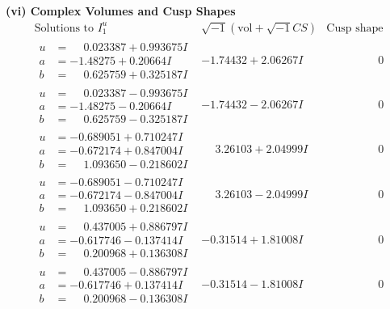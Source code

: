 \documentclass[1p]{elsarticle_modified}
\theoremstyle{definition}
\newcommand{\I}{\sqrt{-1}}
\begin{document}
\newpage\flushleft \textbf{(vi) Complex Volumes and Cusp Shapes}
$$\begin{array}{c|c|c}  
\text{Solutions to }I^u_{1}& \I (\text{vol} + \sqrt{-1}CS) & \text{Cusp shape}\\
 \hline 
\begin{aligned}
u &= \phantom{-}0.023387 + 0.993675 I \\
a &= -1.48275 + 0.20664 I \\
b &= \phantom{-}0.625759 + 0.325187 I\end{aligned}
 & -1.74432 + 2.06267 I & \phantom{-0.000000 } 0 \\ \hline\begin{aligned}
u &= \phantom{-}0.023387 - 0.993675 I \\
a &= -1.48275 - 0.20664 I \\
b &= \phantom{-}0.625759 - 0.325187 I\end{aligned}
 & -1.74432 - 2.06267 I & \phantom{-0.000000 } 0 \\ \hline\begin{aligned}
u &= -0.689051 + 0.710247 I \\
a &= -0.672174 + 0.847004 I \\
b &= \phantom{-}1.093650 - 0.218602 I\end{aligned}
 & \phantom{-}3.26103 + 2.04999 I & \phantom{-0.000000 } 0 \\ \hline\begin{aligned}
u &= -0.689051 - 0.710247 I \\
a &= -0.672174 - 0.847004 I \\
b &= \phantom{-}1.093650 + 0.218602 I\end{aligned}
 & \phantom{-}3.26103 - 2.04999 I & \phantom{-0.000000 } 0 \\ \hline\begin{aligned}
u &= \phantom{-}0.437005 + 0.886797 I \\
a &= -0.617746 - 0.137414 I \\
b &= \phantom{-}0.200968 + 0.136308 I\end{aligned}
 & -0.31514 + 1.81008 I & \phantom{-0.000000 } 0 \\ \hline\begin{aligned}
u &= \phantom{-}0.437005 - 0.886797 I \\
a &= -0.617746 + 0.137414 I \\
b &= \phantom{-}0.200968 - 0.136308 I\end{aligned}
 & -0.31514 - 1.81008 I & \phantom{-0.000000 } 0 \\ \hline\begin{aligned}

\end{aligned}
\end{array}$$
\end{document}
